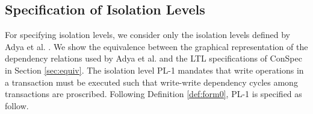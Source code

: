 \documentclass{sig-alternate-05-2015}
\begin{document}
 \subsection{Specification of Isolation Levels}
  For specifying isolation levels, we consider only the isolation levels defined by Adya et al. \cite{DBLP:conf/icde/AdyaLO00}. We show the equivalence between the graphical representation of the dependency relations used by Adya et al. and the LTL specifications of ConSpec in Section \ref{sec:equiv}.
 The isolation level PL-1 mandates that write operations in  a transaction must be executed such that write-write
 dependency cycles among transactions are proscribed. %
 Following Definition \ref{def:form0}, PL-1 is specified %
 as follow.
\end{document}
